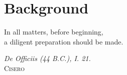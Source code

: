 \chapter{Background}
\vspace*{\fill}
\epigraph{In all matters, before beginning,\\ a diligent preparation should be made.}%
{\textit{De Officiis (44 B.C.), I. 21.}\\ \textsc{Cisero}}
\clearpage{\thispagestyle{empty}\cleardoublepage}
